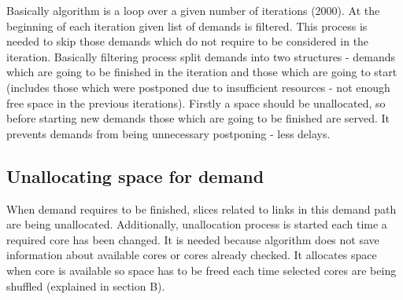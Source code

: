 \documentclass[conference]{IEEEtran}
\begin{document}
Basically algorithm is a loop over a given number of iterations (2000). At the beginning of each iteration given list of demands is filtered. This process is needed to skip those demands which do not require to be considered in the iteration. Basically filtering process split demands into two structures - demands which are going to be finished in the iteration and those which are going to start (includes those which were postponed due to insufficient resources - not enough free space in the previous iterations). Firstly a space should be unallocated, so before starting new demands those which are going to be finished are served. It prevents demands from being unnecessary postponing - less delays.
\subsection{Unallocating space for demand}
When demand requires to be finished, slices related to links in this demand path are being unallocated.
Additionally, unallocation process is started each time a required core has been changed. It is needed because algorithm does not save information about available cores or cores already checked. It allocates space when core is available so space has to be freed each time selected cores are being shuffled (explained in section B).
\end{document}
